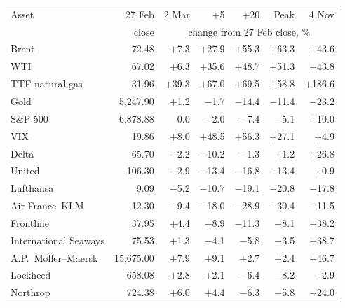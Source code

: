 \begin{tabular}{@{}lrrrrrr@{}}\toprule
Asset & 27 Feb & 2 Mar & +5 & +20 & Peak & 4 Nov\\
 & close & \multicolumn{5}{c}{change from 27 Feb close, \%}\\\midrule
Brent & 72.48 & $+$7.3 & $+$27.9 & $+$55.3 & $+$63.3 & $+$43.6\\
WTI & 67.02 & $+$6.3 & $+$35.6 & $+$48.7 & $+$51.3 & $+$43.8\\
TTF natural gas & 31.96 & $+$39.3 & $+$67.0 & $+$69.5 & $+$58.8 & $+$186.6\\
Gold & 5,247.90 & $+$1.2 & $-$1.7 & $-$14.4 & $-$11.4 & $-$23.2\\
S\&P 500 & 6,878.88 & 0.0 & $-$2.0 & $-$7.4 & $-$5.1 & $+$10.0\\
VIX & 19.86 & $+$8.0 & $+$48.5 & $+$56.3 & $+$27.1 & $+$4.9\\
Delta & 65.70 & $-$2.2 & $-$10.2 & $-$1.3 & $+$1.2 & $+$26.8\\
United & 106.30 & $-$2.9 & $-$13.4 & $-$16.8 & $-$13.4 & $+$0.9\\
Lufthansa & 9.09 & $-$5.2 & $-$10.7 & $-$19.1 & $-$20.8 & $-$17.8\\
Air France--KLM & 12.30 & $-$9.4 & $-$18.0 & $-$28.9 & $-$30.4 & $-$11.5\\
Frontline & 37.95 & $+$4.4 & $-$8.9 & $-$11.3 & $-$8.1 & $+$38.2\\
International Seaways & 75.53 & $+$1.3 & $-$4.1 & $-$5.8 & $-$3.5 & $+$38.7\\
A.P.~M{\o}ller--Maersk & 15,675.00 & $+$7.9 & $+$9.1 & $+$2.7 & $+$2.4 & $+$46.7\\
Lockheed & 658.08 & $+$2.8 & $+$2.1 & $-$6.4 & $-$8.2 & $-$2.9\\
Northrop & 724.38 & $+$6.0 & $+$4.4 & $-$6.3 & $-$5.8 & $-$24.0\\
\bottomrule\end{tabular}